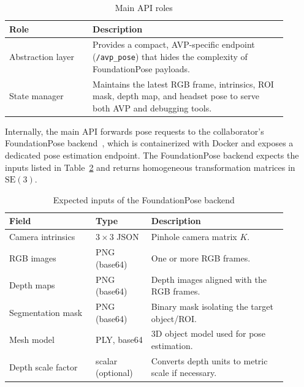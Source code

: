 \begin{table}[H]
    \centering
    \caption{Main API roles}
    \label{tab:main-api-roles}
    \begin{tabular}{p{0.27\linewidth}p{0.63\linewidth}}
        \toprule
        \textbf{Role} & \textbf{Description} \\
        \midrule
        Abstraction layer &
        Provides a compact, AVP-specific endpoint (\texttt{/avp\_pose}) that hides the complexity of FoundationPose payloads. \\
        State manager &
        Maintains the latest RGB frame, intrinsics, ROI mask, depth map, and headset pose to serve both AVP and debugging tools. \\
        \bottomrule
    \end{tabular}
\end{table}

Internally, the main API forwards pose requests to the collaborator’s FoundationPose backend~\cite{matchcow_pose_api}, which is containerized with Docker and exposes a dedicated pose estimation endpoint. The FoundationPose backend expects the inputs listed in Table~\ref{tab:foundationpose-inputs} and returns homogeneous transformation matrices in $\mathrm{SE}(3)$.

\begin{table}[H]
    \centering
    \caption{Expected inputs of the FoundationPose backend}
    \label{tab:foundationpose-inputs}
    \begin{tabular}{p{0.28\linewidth}p{0.18\linewidth}p{0.44\linewidth}}
        \toprule
        \textbf{Field} & \textbf{Type} & \textbf{Description} \\
        \midrule
        Camera intrinsics & $3\times 3$ JSON & Pinhole camera matrix $K$. \\
        RGB images & PNG (base64) & One or more RGB frames. \\
        Depth maps & PNG (base64) & Depth images aligned with the RGB frames. \\
        Segmentation mask & PNG (base64) & Binary mask isolating the target object/ROI. \\
        Mesh model & PLY, base64 & 3D object model used for pose estimation. \\
        Depth scale factor & scalar (optional) & Converts depth units to metric scale if necessary. \\
        \bottomrule
    \end{tabular}
\end{table}

